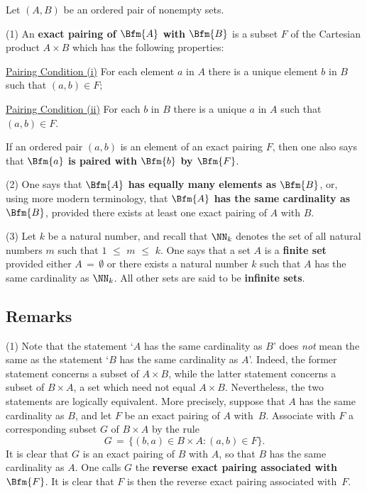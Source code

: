         Let $(A,B)$ be an ordered pair of nonempty sets.

        (1) An {\bf exact pairing of $\Bfm{A}$ with $\Bfm{B}$} is a subset $F$ of the Cartesian product $A{\times}B$ which has the following properties:

\VA

        \h \underline{Pairing Condition (i)} For each element $a$ in $A$ there is a unique element $b$ in $B$ such that $(a,b){\in}F$;

        \h \underline{Pairing Condition (ii)} For each $b$ in $B$ there is a unique $a$ in $A$ such that $(a,b){\in}F$.

\VA

\noindent If an ordered pair $(a,b)$ is an element of an exact pairing $F$, then one also says that {\bf $\Bfm{a}$ is paired with $\Bfm{b}$ by $\Bfm{F}$}.

\V

        (2) One says that {\bf $\Bfm{A}$ has equally many elements as $\Bfm{B}$}, or, using more modern terminology,
    that {\bf $\Bfm{A}$ has the same cardinality as $\Bfm{B}$}, provided there exists at least one exact pairing of $A$ with $B$.

\V

        (3) Let $k$ be a natural number, and recall that ${\NN}_{k}$ denotes the set of all natural numbers $m$ such that $1\,\,{\leq}\,\,m\,\,{\leq}\,\,k$.
    One says that a set $A$ is a {\bf finite set}
    provided either $A \,=\, {\emptyset}$ or there exists a natural number $k$ such that $A$ has the same cardinality as ${\NN}_{k}$.
    All other sets are said to be {\bf infinite sets}.

\VV

        \subsection{\small{\bf Remarks}}
            \label{RemrkA12.80}

\hspace*{\parindent} (1) Note that the statement `$A$ has the same cardinality as $B$'
    does {\em not} mean the same as the statement `$B$ has the same cardinality as $A$'. Indeed, the former statement concerns a subset of $A{\times}B$,
    while the latter statement concerns a subset of $B{\times}A$, a set which need not equal $A{\times}B$.
    Nevertheless, the two statements are logically equivalent. More precisely, suppose that $A$ has the same cardinality as $B$,
    and let $F$ be an exact pairing of $A$ with~$B$. Associate with $F$ a corresponding subset $G$ of $B{\times}A$ by the rule
        \begin{displaymath}
        G \,=\, \{(b,a){\in}B{\times}A: (a,b){\in}F\}.
        \end{displaymath}
    It is clear that $G$ is an exact pairing of $B$ with $A$, so that $B$ has the same cardinality as $A$.
    One calls $G$ the {\bf reverse exact pairing associated with $\Bfm{F}$}.
    It is clear that $F$ is then the reverse exact pairing associated with~$F$.


